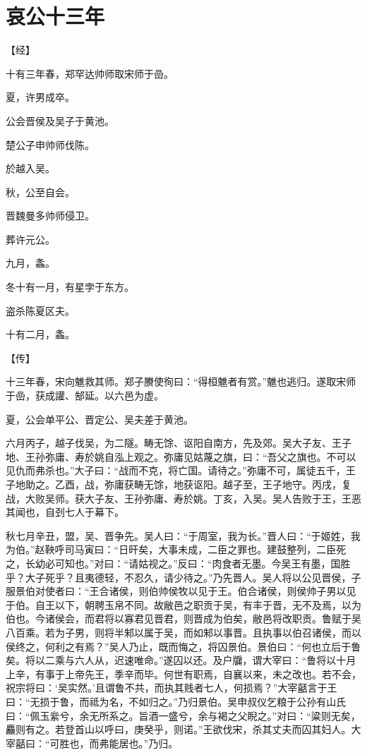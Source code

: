 \documentclass[a4paper,12pt,UTF8,twoside]{ctexbook}
\begin{document}
\section{哀公十三年}




【经】

十有三年春，郑罕达帅师取宋师于嵒。

夏，许男成卒。

公会晋侯及吴子于黄池。

楚公子申帅师伐陈。

於越入吴。

秋，公至自会。

晋魏曼多帅师侵卫。

葬许元公。

九月，螽。

冬十有一月，有星孛于东方。

盗杀陈夏区夫。

十有二月，螽。

【传】

十三年春，宋向魋救其师。郑子賸使徇曰：“得桓魋者有赏。”魋也逃归。遂取宋师于嵒，获成讙、郜延。以六邑为虚。

夏，公会单平公、晋定公、吴夫差于黄池。

六月丙子，越子伐吴，为二隧。畴无馀、讴阳自南方，先及郊。吴大子友、王子地、王孙弥庸、寿於姚自泓上观之。弥庸见姑蔑之旗，曰：“吾父之旗也。不可以见仇而弗杀也。”大子曰：“战而不克，将亡国。请待之。”弥庸不可，属徒五千，王子地助之。乙酉，战，弥庸获畴无馀，地获讴阳。越子至，王子地守。丙戌，复战，大败吴师。获大子友、王孙弥庸、寿於姚。丁亥，入吴。吴人告败于王，王恶其闻也，自刭七人于幕下。

秋七月辛丑，盟，吴、晋争先。吴人曰：“于周室，我为长。”晋人曰：“于姬姓，我为伯。”赵鞅呼司马寅曰：“日旰矣，大事未成，二臣之罪也。建鼓整列，二臣死之，长幼必可知也。”对曰：“请姑视之。”反曰：“肉食者无墨。今吴王有墨，国胜乎？大子死乎？且夷德轻，不忍久，请少待之。”乃先晋人。吴人将以公见晋侯，子服景伯对使者曰：“王合诸侯，则伯帅侯牧以见于王。伯合诸侯，则侯帅子男以见于伯。自王以下，朝聘玉帛不同。故敝邑之职贡于吴，有丰于晋，无不及焉，以为伯也。今诸侯会，而君将以寡君见晋君，则晋成为伯矣，敝邑将改职贡。鲁赋于吴八百乘。若为子男，则将半邾以属于吴，而如邾以事晋。且执事以伯召诸侯，而以侯终之，何利之有焉？”吴人乃止，既而悔之，将囚景伯。景伯曰：“何也立后于鲁矣。将以二乘与六人从，迟速唯命。”遂囚以还。及户牖，谓大宰曰：“鲁将以十月上辛，有事于上帝先王，季辛而毕。何世有职焉，自襄以来，未之改也。若不会，祝宗将曰：‘吴实然。’且谓鲁不共，而执其贱者七人，何损焉？”大宰嚭言于王曰：“无损于鲁，而祗为名，不如归之。”乃归景伯。吴申叔仪乞粮于公孙有山氏曰：“佩玉繠兮，余无所系之。旨酒一盛兮，余与褐之父睨之。”对曰：“粱则无矣，麤则有之。若登首山以呼曰，庚癸乎，则诺。”王欲伐宋，杀其丈夫而囚其妇人。大宰嚭曰：“可胜也，而弗能居也。”乃归。
\end{document}
